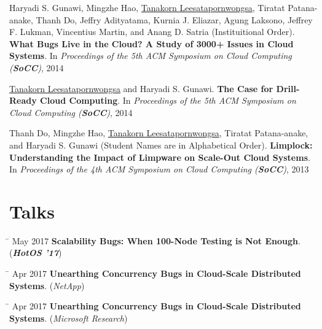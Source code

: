 \documentclass[10pt]{article} %
\begin{document}
Haryadi S. Gunawi, Mingzhe Hao, \underline{Tanakorn Leesatapornwongsa}, Tiratat
Patana-anake, Thanh Do, Jeffry Adityatama, Kurnia J. Eliazar, Agung Laksono,
Jeffrey F. Lukman, Vincentius Martin, and Anang D. Satria (Instituitional Order).
\textbf{What Bugs Live in the Cloud? A Study of 3000+ Issues in Cloud Systems}.
In \textit{Proceedings of the 5th ACM Symposium on Cloud Computing (\textbf{SoCC})}, 2014
\vspace{2mm}

\underline{Tanakorn Leesatapornwongsa} and Haryadi S. Gunawi. \textbf{The Case
for Drill-Ready Cloud Computing}. In \textit{Proceedings of the 5th ACM
Symposium on Cloud Computing (\textbf{SoCC})}, 2014
\vspace{2mm}

Thanh Do, Mingzhe Hao, \underline{Tanakorn Leesatapornwongsa}, Tiratat
Patana-anake, and Haryadi S. Gunawi (Student Names are in Alphabetical Order).
\textbf{Limplock: Understanding the Impact of Limpware on Scale-Out Cloud
Systems}. In \textit{Proceedings of the 4th ACM Symposium on Cloud Computing
(\textbf{SoCC})}, 2013


\section{Talks}

\begin{tabbing}
\hspace{2.5cm} \= \kill
May 2017 \> \textbf{Scalability Bugs: When 100-Node Testing is Not Enough}. (\textbf{\textit{HotOS '17}})\footnotemark
\end{tabbing}

\begin{tabbing}
\hspace{2.5cm} \= \kill
Apr 2017 \> \textbf{Unearthing Concurrency Bugs in Cloud-Scale Distributed Systems}. (\textit{NetApp})
\end{tabbing}

\begin{tabbing}
\hspace{2.5cm} \= \kill
Apr 2017 \> \textbf{Unearthing Concurrency Bugs in Cloud-Scale Distributed Systems}. (\textit{Microsoft Research})
\end{tabbing}
\end{document}
